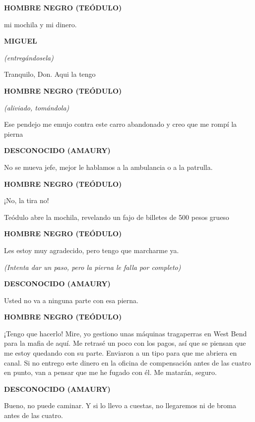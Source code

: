\documentclass[11pt]{report}
\newenvironment{scenedesc}{\vspace{1em}\par\noindent\small\rmfamily}{\vspace{1em}}
\newenvironment{dialogue}[1]{
    \vspace{0.5em}\par\begin{center}\textbf{\MakeUppercase{#1}}\end{center}\vspace{-0.5em}
    \begin{list}{}{
        \leftmargin=1.5in
        \rightmargin=1.5in
        \parsep=0pt
    }\item[]
}{
    \end{list}\vspace{0.5em}
}
\newcommand{\parenthetical}[1]{\vspace{-0.3em}\begin{center}\textit{(#1)}\end{center}\vspace{-0.3em}}
\begin{document}
\begin{dialogue}{Hombre Negro (Teódulo)}
 mi mochila y mi dinero.
\end{dialogue}

\begin{dialogue}{Miguel}
\parenthetical{entregándosela}
Tranquilo, Don. Aqui la tengo
\end{dialogue}

\begin{dialogue}{Hombre Negro (Teódulo)}
\parenthetical{aliviado, tomándola}
Ese pendejo me emujo contra este carro abandonado y creo que me rompí la pierna
\end{dialogue}

\begin{dialogue}{Desconocido (Amaury)}
No se mueva jefe, mejor le hablamos a la ambulancia o a la patrulla.
\end{dialogue}

\begin{dialogue}{Hombre Negro (Teódulo)}
¡No, la tira  no!
\end{dialogue}

\begin{scenedesc}
Teódulo abre la mochila, revelando un fajo de billetes de 500 pesos grueso
\end{scenedesc}

\begin{dialogue}{Hombre Negro (Teódulo)}
Les estoy muy agradecido, pero tengo que marcharme ya.
\parenthetical{Intenta dar un paso, pero la pierna le falla por completo}
\end{dialogue}

\begin{dialogue}{Desconocido (Amaury)}
Usted no va a ninguna parte con esa pierna.
\end{dialogue}

\begin{dialogue}{Hombre Negro (Teódulo)}
¡Tengo que hacerlo! Mire, yo gestiono unas máquinas tragaperras en West Bend para la mafia de aquí. Me retrasé un poco con los pagos, así que se piensan que me estoy quedando con su parte. Enviaron a un tipo para que me abriera en canal. Si no entrego este dinero en la oficina de compensación antes de las cuatro en punto, van a pensar que me he fugado con él. Me matarán, seguro.
\end{dialogue}

\begin{dialogue}{Desconocido (Amaury)}
Bueno, no puede caminar. Y si lo llevo a cuestas, no llegaremos ni de broma antes de las cuatro.
\end{dialogue}
\end{document}
